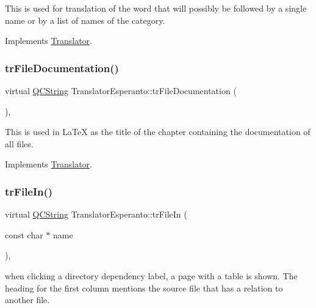 This is used for translation of the word that will possibly be followed by a single name or by a list of names of the category. 

Implements \mbox{\hyperlink{class_translator}{Translator}}.

\mbox{\label{class_translator_esperanto_ac034c1189fce0edf6795349561fc57d9}} 
\subsubsection{\texorpdfstring{trFileDocumentation()}{trFileDocumentation()}}
{\footnotesize\ttfamily virtual \mbox{\hyperlink{class_q_c_string}{Q\+C\+String}} Translator\+Esperanto\+::tr\+File\+Documentation (\begin{DoxyParamCaption}{ }\end{DoxyParamCaption})\hspace{0.3cm}{\ttfamily [inline]}, {\ttfamily [virtual]}}

This is used in La\+TeX as the title of the chapter containing the documentation of all files. 

Implements \mbox{\hyperlink{class_translator}{Translator}}.

\mbox{\label{class_translator_esperanto_a28d039595516170583c1a6bafe26299c}} 
\subsubsection{\texorpdfstring{trFileIn()}{trFileIn()}}
{\footnotesize\ttfamily virtual \mbox{\hyperlink{class_q_c_string}{Q\+C\+String}} Translator\+Esperanto\+::tr\+File\+In (\begin{DoxyParamCaption}\item[{const char $\ast$}]{name }\end{DoxyParamCaption})\hspace{0.3cm}{\ttfamily [inline]}, {\ttfamily [virtual]}}

when clicking a directory dependency label, a page with a table is shown. The heading for the first column mentions the source file that has a relation to another file. 

